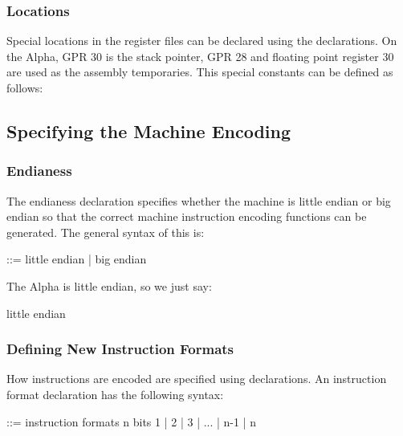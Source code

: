 \subsubsection{Locations}

  Special locations in the register files can be declared using the
 declarations.  On the Alpha, GPR
30 is the stack pointer, GPR 28 and floating point register 30
are used as the assembly temporaries.  This special constants
can be defined as follows:


\subsection{Specifying the Machine Encoding}
\subsubsection{Endianess}

The endianess declaration specifies whether the machine is little
endian or big endian so that the correct machine instruction encoding 
functions can be generated.  The general syntax of this is:

\begin{SML}
    ::= little endian | big endian
\end{SML}

The Alpha is little endian, so we just say: 
\begin{SML}
    little endian
\end{SML}

\subsubsection{Defining New Instruction Formats}

   How instructions are encoded are specified using 
 declarations.  An instruction format declaration
has the following syntax:
\begin{SML}
   ::=
     instruction formats n bits 
       1
     | 2
     | 3
     | ...
     | n-1
     | n
\end{SML}

